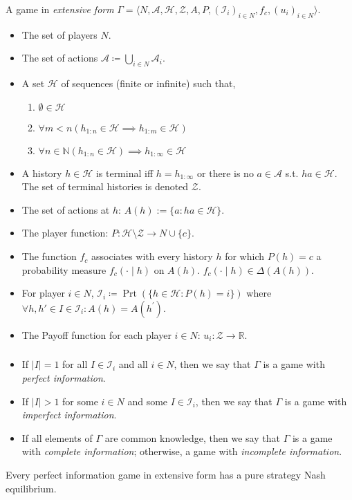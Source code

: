 \documentclass[UTF8,11pt,colorlinks,compress,openany]{beamer}%
\begin{document}
\begin{frame}\frametitle{}
\begin{definition}
	A game in \emph{extensive form} $\Gamma=\langle N,\mathcal{A},\mathcal{H},\mathcal{Z},A,P,(\mathcal{I}_i)_{i\in N},f_c,(u_i)_{i\in N}\rangle$.
	\begin{itemize}
		\item The set of players $N$.
		\item The set of actions $\mathcal{A}\coloneqq\bigcup_{i\in N}\mathcal{A}_i$.
		\item A set $\mathcal{H}$ of sequences (finite or infinite) such that,
		\begin{enumerate}
			\item $\emptyset\in \mathcal{H}$
			\item $\forall m<n\left(h_{1:n}\in \mathcal{H}\implies h_{1:m}\in \mathcal{H}\right)$
			\item $\forall n\in\mathbb N\left(h_{1:n}\in \mathcal{H}\right)\implies h_{1:\infty}\in \mathcal{H}$
		\end{enumerate}
		\item A history $h\in \mathcal{H}$ is terminal iff $h=h_{1:\infty}$ or there is no $a\in \mathcal{A}$ s.t. $ha\in \mathcal{H}$. The set of terminal histories is denoted $\mathcal{Z}$.
		\item The set of actions at $h$: $A(h):=\{a:ha\in \mathcal{H}\}$.
		\item The player function: $P:\mathcal{H}\setminus \mathcal{Z}\to N\cup\{c\}$.
		\item The function $f_c$ associates with every history $h$ for which $P(h)=c$ a probability measure $f_c(\cdot\mid h)$ on $A(h)$. $f_c(\cdot\mid h)\in\Delta(A(h))$.
		\item For player $i\in N$, $\mathcal{I}_i\coloneqq \operatorname{Prt}(\{h\in \mathcal{H}:P(h)=i\})$ where $\forall h,h'\in I\in\mathcal{I}_i: A(h)=A(h^\prime)$.
		\item The Payoff function for each player $i\in N$: $u_i: \mathcal{Z}\to\mathbb R$.
	\end{itemize}
\end{definition}
\end{frame}

\begin{frame}\frametitle{}
\begin{itemize}
	\item If $|I|=1$ for all $I\in\mathcal{I}_i$ and all $i\in N$, then we say that $\Gamma$ is a game with \emph{perfect information}.
	\item If $|I|>1$ for some $i\in N$ and some $I\in\mathcal{I}_i$, then we say that $\Gamma$ is a game with \emph{imperfect information}.
	\item If all elements of $\Gamma$ are common knowledge, then we say that $\Gamma$ is a game with \emph{complete information}; otherwise, a game with \emph{incomplete information}.
\end{itemize}
\begin{theorem}
Every perfect information game in extensive form has a pure strategy Nash equilibrium.
\end{theorem}
\end{frame}
\end{document}
